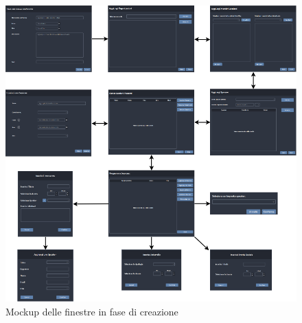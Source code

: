 \begin{figure}[h!]
	\centering
	\includegraphics[scale=0.57]{Immagini/Mockup/Create/Flow_Create.png}
	\caption{Mockup delle finestre in fase di creazione}\label{create}
\end{figure}

